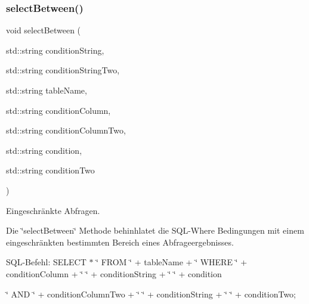\subsubsection{select\+Between()}
{\footnotesize\ttfamily void select\+Between (\begin{DoxyParamCaption}\item[{std\+::string}]{condition\+String,  }\item[{std\+::string}]{condition\+String\+Two,  }\item[{std\+::string}]{table\+Name,  }\item[{std\+::string}]{condition\+Column,  }\item[{std\+::string}]{condition\+Column\+Two,  }\item[{std\+::string}]{condition,  }\item[{std\+::string}]{condition\+Two }\end{DoxyParamCaption})}



Eingeschränkte Abfragen. 

Die \char`\"{}select\+Between\char`\"{} Methode behinhlatet die S\+Q\+L-\/\+Where Bedingungen mit einem eingeschränkten bestimmten Bereich eines Abfrageergebnisses.~\newline


S\+Q\+L-\/\+Befehl\+: S\+E\+L\+E\+CT $\ast$ \char`\"{} F\+R\+O\+M \char`\"{} + table\+Name + \char`\"{} W\+H\+E\+R\+E \char`\"{} + condition\+Column + \char`\"{} \char`\"{} + condition\+String + \char`\"{} \char`\"{} + condition
\begin{DoxyItemize}
\item \char`\"{} A\+N\+D \char`\"{} + condition\+Column\+Two + \char`\"{} \char`\"{} + condition\+String + \char`\"{} \char`\"{} + condition\+Two;
\end{DoxyItemize}


